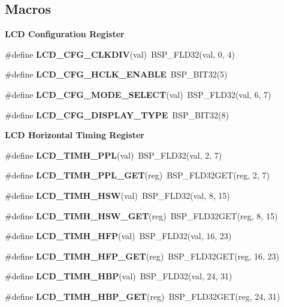 \subsection*{Macros}
\begin{Indent}\textbf{ L\+CD Configuration Register}\par
\begin{DoxyCompactItemize}
\item 
\#define {\bfseries L\+C\+D\+\_\+\+C\+F\+G\+\_\+\+C\+L\+K\+D\+IV}(val)~B\+S\+P\+\_\+\+F\+L\+D32(val, 0, 4)
\item 
\#define {\bfseries L\+C\+D\+\_\+\+C\+F\+G\+\_\+\+H\+C\+L\+K\+\_\+\+E\+N\+A\+B\+LE}~B\+S\+P\+\_\+\+B\+I\+T32(5)
\item 
\#define {\bfseries L\+C\+D\+\_\+\+C\+F\+G\+\_\+\+M\+O\+D\+E\+\_\+\+S\+E\+L\+E\+CT}(val)~B\+S\+P\+\_\+\+F\+L\+D32(val, 6, 7)
\item 
\#define {\bfseries L\+C\+D\+\_\+\+C\+F\+G\+\_\+\+D\+I\+S\+P\+L\+A\+Y\+\_\+\+T\+Y\+PE}~B\+S\+P\+\_\+\+B\+I\+T32(8)
\end{DoxyCompactItemize}
\end{Indent}
\begin{Indent}\textbf{ L\+CD Horizontal Timing Register}\par
\begin{DoxyCompactItemize}
\item 
\#define {\bfseries L\+C\+D\+\_\+\+T\+I\+M\+H\+\_\+\+P\+PL}(val)~B\+S\+P\+\_\+\+F\+L\+D32(val, 2, 7)
\item 
\#define {\bfseries L\+C\+D\+\_\+\+T\+I\+M\+H\+\_\+\+P\+P\+L\+\_\+\+G\+ET}(reg)~B\+S\+P\+\_\+\+F\+L\+D32\+G\+ET(reg, 2, 7)
\item 
\#define {\bfseries L\+C\+D\+\_\+\+T\+I\+M\+H\+\_\+\+H\+SW}(val)~B\+S\+P\+\_\+\+F\+L\+D32(val, 8, 15)
\item 
\#define {\bfseries L\+C\+D\+\_\+\+T\+I\+M\+H\+\_\+\+H\+S\+W\+\_\+\+G\+ET}(reg)~B\+S\+P\+\_\+\+F\+L\+D32\+G\+ET(reg, 8, 15)
\item 
\#define {\bfseries L\+C\+D\+\_\+\+T\+I\+M\+H\+\_\+\+H\+FP}(val)~B\+S\+P\+\_\+\+F\+L\+D32(val, 16, 23)
\item 
\#define {\bfseries L\+C\+D\+\_\+\+T\+I\+M\+H\+\_\+\+H\+F\+P\+\_\+\+G\+ET}(reg)~B\+S\+P\+\_\+\+F\+L\+D32\+G\+ET(reg, 16, 23)
\item 
\#define {\bfseries L\+C\+D\+\_\+\+T\+I\+M\+H\+\_\+\+H\+BP}(val)~B\+S\+P\+\_\+\+F\+L\+D32(val, 24, 31)
\item 
\#define {\bfseries L\+C\+D\+\_\+\+T\+I\+M\+H\+\_\+\+H\+B\+P\+\_\+\+G\+ET}(reg)~B\+S\+P\+\_\+\+F\+L\+D32\+G\+ET(reg, 24, 31)
\end{DoxyCompactItemize}
\end{Indent}
